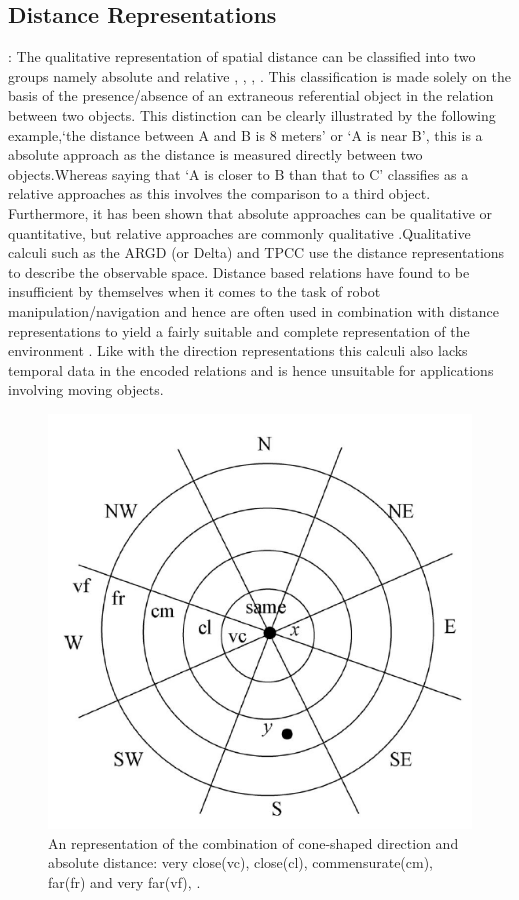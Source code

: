 		\subsection{Distance Representations}: The qualitative representation of spatial distance can be classified into two groups namely absolute and relative \cite{isli2000new}, \cite{chen2015survey}, \cite{cohn2001qualitative}, \cite{isli2001combining}. This classification is made solely on the basis of  the presence/absence of an extraneous referential object in the relation between two objects. This distinction can be clearly illustrated by the following example,`the distance between A and B is 8 meters' or `A is near B', this is a absolute approach as the distance is measured directly between two objects.Whereas saying that `A is closer to B than that to C' classifies as a relative approaches as this involves the comparison to a third object. Furthermore, it has been shown that absolute approaches	can be qualitative or quantitative, but relative approaches are commonly qualitative \cite{cohn2001qualitative}.Qualitative calculi such as the ARGD (or Delta) and TPCC use the distance representations to describe the observable space. Distance based relations have found to be insufficient by themselves when it comes to the task of robot manipulation/navigation and hence are often used in combination with distance representations to yield a fairly suitable and complete representation of the environment \cite{chen2015survey}. Like with the direction representations this calculi also lacks temporal data in the encoded relations and is hence unsuitable for applications involving moving objects.
		
		\begin{figure}[h]
			\centering
			\includegraphics[scale=0.8]{images/argd_delta}
			\caption{An representation of the combination of cone-shaped direction and absolute distance: very
				close(vc), close(cl), commensurate(cm), far(fr) and very far(vf), \cite{clementini1997qualitative}.}
			\label{fig:argddelta}
		\end{figure}
		
